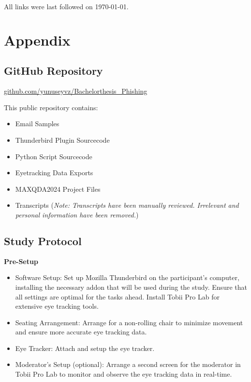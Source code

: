 \documentclass[
  a4paper,  %
  twoside,  %
  bibliography=totoc,
  headsepline,
  cleardoublepage=empty,
  parskip=half,
  draft=false
]{scrbook}
\begin{document}
%
%


\printbibliography

All links were last followed on \today{}.

\appendix
\chapter{Appendix}

\section{GitHub Repository}
\label{sec:github}

{\large \faGithub} \hspace{2pt} \href{https://github.com/yunuseyvz/Bachelorthesis_Phishing}{github.com/yunuseyvz/Bachelorthesis\_Phishing}

\par
This public repository contains: 

\begin{itemize}
    \item Email Samples
    \item Thunderbird Plugin Sourcecode
    \item Python Script Sourcecode
    \item Eyetracking Data Exports 
    \item MAXQDA2024 Project Files 
    \item Transcripts (\textit{Note: Transcripts have been manually reviewed. Irrelevant and personal information have been removed.})

\end{itemize}

\section{Study Protocol}
\label{sec:protocol}

\textbf{Pre-Setup}
\begin{itemize}
    \item Software Setup: Set up Mozilla Thunderbird on the participant's computer, installing the necessary addon that will be used during the study. Ensure that all settings are optimal for the tasks ahead. Install Tobii Pro Lab for extensive eye tracking tools.
    \item Seating Arrangement: Arrange for a non-rolling chair to minimize movement and ensure more accurate eye tracking data.
    \item Eye Tracker: Attach and setup the eye tracker.
    \item Moderator's Setup (optional): Arrange a second screen for the moderator in Tobii Pro Lab to monitor and observe the eye tracking data in real-time.
\end{itemize}
\end{document}
